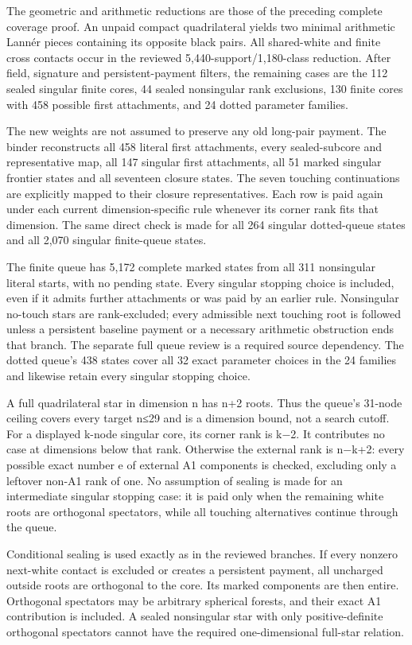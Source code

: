 \documentclass[
  10pt,
]{report}
\begin{document}
The geometric and arithmetic reductions are those of the preceding
complete coverage proof. An unpaid compact quadrilateral yields two
minimal arithmetic Lannér pieces containing its opposite black pairs.
All shared-white and finite cross contacts occur in the reviewed
5,440-support/1,180-class reduction. After field, signature and
persistent-payment filters, the remaining cases are the 112 sealed
singular finite cores, 44 sealed nonsingular rank exclusions, 130 finite
cores with 458 possible first attachments, and 24 dotted parameter
families.

The new weights are not assumed to preserve any old long-pair payment.
The binder reconstructs all 458 literal first attachments, every
sealed-subcore and representative map, all 147 singular first
attachments, all 51 marked singular frontier states and all seventeen
closure states. The seven touching continuations are explicitly mapped
to their closure representatives. Each row is paid again under each
current dimension-specific rule whenever its corner rank fits that
dimension. The same direct check is made for all 264 singular
dotted-queue states and all 2,070 singular finite-queue states.

The finite queue has 5,172 complete marked states from all 311
nonsingular literal starts, with no pending state. Every singular
stopping choice is included, even if it admits further attachments or
was paid by an earlier rule. Nonsingular no-touch stars are
rank-excluded; every admissible next touching root is followed unless a
persistent baseline payment or a necessary arithmetic obstruction ends
that branch. The separate full queue review is a required source
dependency. The dotted queue's 438 states cover all 32 exact parameter
choices in the 24 families and likewise retain every singular stopping
choice.

A full quadrilateral star in dimension n has n+2 roots. Thus the queue's
31-node ceiling covers every target n≤29 and is a dimension bound, not a
search cutoff. For a displayed k-node singular core, its corner rank is
k−2. It contributes no case at dimensions below that rank. Otherwise the
external rank is n−k+2: every possible exact number e of external A1
components is checked, excluding only a leftover non-A1 rank of one. No
assumption of sealing is made for an intermediate singular stopping
case: it is paid only when the remaining white roots are orthogonal
spectators, while all touching alternatives continue through the queue.

Conditional sealing is used exactly as in the reviewed branches. If
every nonzero next-white contact is excluded or creates a persistent
payment, all uncharged outside roots are orthogonal to the core. Its
marked components are then entire. Orthogonal spectators may be
arbitrary spherical forests, and their exact A1 contribution is
included. A sealed nonsingular star with only positive-definite
orthogonal spectators cannot have the required one-dimensional full-star
relation.
\end{document}
